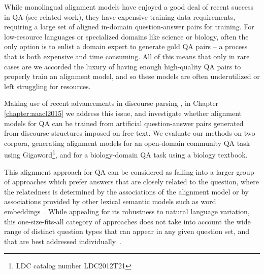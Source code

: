 While monolingual alignment models have enjoyed a good deal of recent success in QA (see related work), they have expensive training data requirements,  
requiring a large set of aligned in-domain question-answer pairs for training.
For low-resource languages or specialized domains like science or biology, often the only option is to enlist a domain expert to generate gold QA pairs --  a process that is both expensive and time consuming.  All of this means that only in rare cases are we accorded the luxury of having enough high-quality QA pairs to properly train an alignment model, and so these models are often underutilized or left struggling for resources. 

Making use of recent advancements in discourse parsing \cite{feng12}, in Chapter \ref{chapter:naacl2015} we address this issue, and investigate whether alignment models for QA can be trained from artificial question-answer pairs generated from discourse structures imposed on free text. 
We evaluate our methods on two corpora, generating alignment models for an open-domain community QA task using Gigaword\footnote{LDC catalog number LDC2012T21}, and for a biology-domain QA task using a biology textbook. 


\address{Diff info needs and so the “manner” by which the lexical chasm is bridged should hopefully be robust to that}

This alignment approach for QA can be considered as falling into a larger group of approaches which prefer answers that are closely related to the question, where the relatedness is determined by the associations of the alignment model or by associations provided by other lexical semantic models such as word embeddings~\cite{yih13,jansen14,fried2015higher}. 
While appealing for its robustness to natural language variation, this one-size-fits-all category of approaches does not take into account the wide range of distinct question types that can appear in any given question set, and that are best addressed individually~\cite{chu2004ibm,ferrucci2010building,clark2013study}.  

